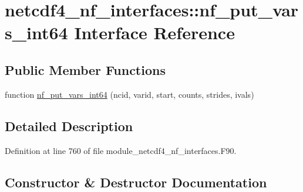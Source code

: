 \hypertarget{interfacenetcdf4__nf__interfaces_1_1nf__put__vars__int64}{}\section{netcdf4\+\_\+nf\+\_\+interfaces\+:\+:nf\+\_\+put\+\_\+vars\+\_\+int64 Interface Reference}
\label{interfacenetcdf4__nf__interfaces_1_1nf__put__vars__int64}
\subsection*{Public Member Functions}
\begin{DoxyCompactItemize}
\item 
function \hyperlink{interfacenetcdf4__nf__interfaces_1_1nf__put__vars__int64_ace573aefd9282dfb030eafb7c5a6f5f1}{nf\+\_\+put\+\_\+vars\+\_\+int64} (ncid, varid, start, counts, strides, ivals)
\end{DoxyCompactItemize}


\subsection{Detailed Description}


Definition at line 760 of file module\+\_\+netcdf4\+\_\+nf\+\_\+interfaces.\+F90.



\subsection{Constructor \& Destructor Documentation}
\mbox{\label{interfacenetcdf4__nf__interfaces_1_1nf__put__vars__int64_ace573aefd9282dfb030eafb7c5a6f5f1}} 
